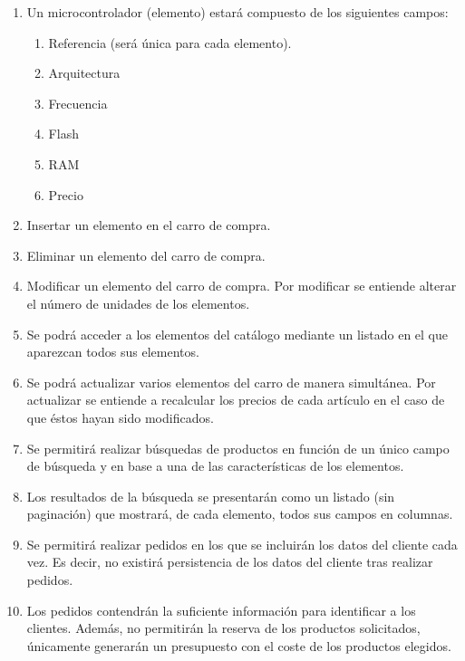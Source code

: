 \begin{enumerate}

\item Un microcontrolador (elemento) estará compuesto de los siguientes campos: 
	\begin{enumerate}
		\item Referencia (será única para cada elemento).
        \item Arquitectura
        \item Frecuencia
        \item Flash
        \item RAM
        \item Precio
	\end{enumerate}
	
\item Insertar un elemento en el carro de compra.
   
\item Eliminar un elemento del carro de compra.
	
\item Modificar un elemento del carro de compra. Por modificar se entiende alterar el número de unidades de los elementos.

\item Se podrá acceder a los elementos del catálogo mediante un listado en el que aparezcan todos sus elementos.

\item Se podrá actualizar varios elementos del carro de manera simultánea. Por actualizar se entiende a recalcular los precios de cada artículo en el caso de que éstos hayan sido modificados.

\item Se permitirá realizar búsquedas de productos en función de un único campo de búsqueda y en base a una de las características de los elementos. 
	
\item Los resultados de la búsqueda se presentarán como un listado (sin paginación) que mostrará, de cada elemento, todos sus campos en columnas.

\item Se permitirá realizar pedidos en los que se incluirán los datos del cliente cada vez. Es decir, no existirá persistencia de los datos del cliente tras realizar pedidos.

\item Los pedidos contendrán la suficiente información para identificar a los clientes. Además, no permitirán la reserva de los productos solicitados, únicamente generarán un presupuesto con el coste de los productos elegidos.


\end{enumerate}
